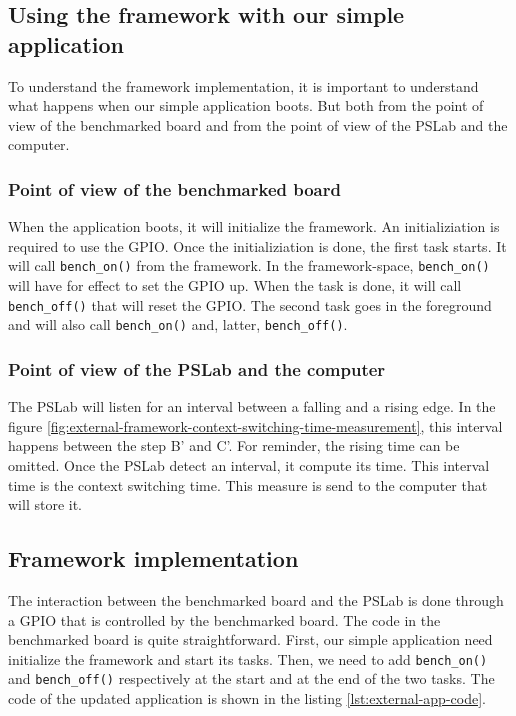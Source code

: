 \subsection{Using the framework with our simple application}

To understand the framework implementation, it is important to understand what happens when our simple application boots.
But both from the point of view of the benchmarked board and from the point of view of the PSLab and the computer.

\subsubsection{Point of view of the benchmarked board}
When the application boots, it will initialize the framework.
An initializiation is required to use the GPIO.
Once the initializiation is done, the first task starts.
It will call \texttt{bench\_on()} from the framework.
In the framework-space, \texttt{bench\_on()} will have for effect to set the GPIO up.
When the task is done, it will call \texttt{bench\_off()} that will reset the GPIO.
The second task goes in the foreground and will also call \texttt{bench\_on()} and, latter, \texttt{bench\_off()}.

\subsubsection{Point of view of the PSLab and the computer}
The PSLab will listen for an interval between a falling and a rising edge.
In the figure \ref{fig:external-framework-context-switching-time-measurement}, this interval happens between the step B' and C'.
For reminder, the rising time can be omitted.
Once the PSLab detect an interval, it compute its time.
This interval time is the context switching time.
This measure is send to the computer that will store it.

\subsection{Framework implementation}

The interaction between the benchmarked board and the PSLab is done through a GPIO that is controlled by the benchmarked board.
The code in the benchmarked board is quite straightforward.
First, our simple application need initialize the framework and start its tasks.
Then, we need to add \texttt{bench\_on()} and \texttt{bench\_off()} respectively at the start and at the end of the two tasks.
The code of the updated application is shown in the listing \ref{lst:external-app-code}.

